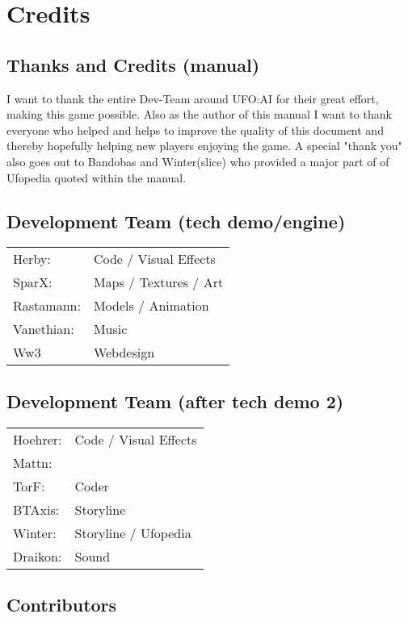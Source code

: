\newpage

\section{Credits}
\subsection{Thanks and Credits (manual)}
I want to thank the entire Dev-Team around UFO:AI for their great effort, making this game possible. Also as the author of this manual I want to thank everyone who helped and helps to improve the quality of this document and thereby hopefully helping new players enjoying the game. A special "thank you" also goes out to Bandobas and Winter(slice) who provided a major part of of Ufopedia quoted within the manual.

\subsection{Development Team (tech demo/engine)}
\begin{tabular}{ll}
Herby:  			&  Code / Visual Effects	\\ 
SparX:  			&  Maps / Textures / Art	\\ 
Rastamann:  	&  Models / Animation		\\ 
Vanethian:  		&  Music							\\ 
Ww3					&	 Webdesign					\\
\end{tabular} 

\subsection{Development Team (after tech demo 2)}
\begin{tabular}{ll}
Hoehrer:  			&  Code / Visual Effects	\\ 
Mattn:  				&  									\\ 
TorF:  					&  Coder							\\ 
BTAxis:  				&  Storyline						\\ 
Winter:					&	 Storyline / Ufopedia	\\
Draikon:				& Sound							\\	
\end{tabular} 

\subsection{Contributors}

